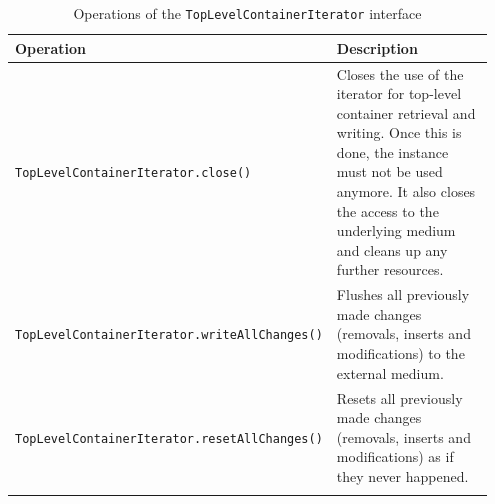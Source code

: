 \small
\begin{landscape}
\begin{longtable}{|p{0.3\linewidth}|p{0.65\linewidth}|}
\hline
\rowcolor[gray]{.9}\textbf{Operation} & \textbf{Description} \\
\endhead
\hline
\texttt{TopLevelContainerIterator}\linebreak\texttt{.close()} & Closes the use of the iterator for top-level container retrieval and writing. Once this is done, the instance must not be used anymore. It also closes the access to the underlying medium and cleans up any further resources. \\
\hline
\texttt{TopLevelContainerIterator}\linebreak\texttt{.writeAllChanges()} & Flushes all previously made changes (removals, inserts and modifications) to the external medium. \\
\hline
\texttt{TopLevelContainerIterator}\linebreak\texttt{.resetAllChanges()} & Resets all previously made changes (removals, inserts and modifications) as if they never happened. \\
\hline
\caption{Operations of the \texttt{TopLevelContainerIterator} interface}
\label{tab:DBOpsTopLevelContainerIterator}
\end{longtable}
\end{landscape}
\normalsize

